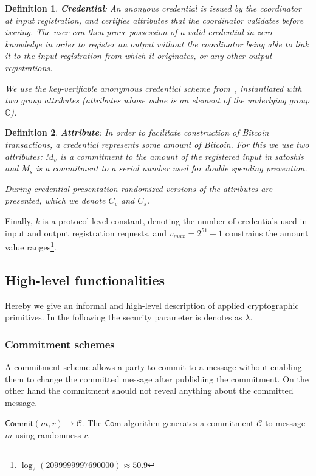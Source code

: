 \documentclass{article}
\newtheorem{definition}{Definition}[section]
\begin{document}
\begin{definition} \textbf{Credential}:
An anonyous credential is issued by the coordinator at input registration, and certifies attributes that the coordinator validates before issuing. The user can then prove possession of a valid credential in zero-knowledge in order to register an output without the coordinator being able to link it to the input registration from which it originates, or any other output registrations.

We use the key-verifiable anonymous credential scheme from~\cite{chase2019signal}, instantiated with two group attributes (attributes whose value is an element of the underlying group $\mathbb{G}$).
\end{definition}

\begin{definition}\textbf{Attribute}:
In order to facilitate construction of Bitcoin transactions, a credential represents some amount of Bitcoin. For this we use two attributes: $M_v$ is a commitment to the amount of the registered input in satoshis and $M_s$ is a commitment to a serial number used for double spending prevention.

During credential presentation randomized versions of the attributes are presented, which we denote $C_v$ and $C_s$.
\end{definition}

Finally, $k$ is a protocol level constant, denoting the number of credentials used in input and output registration requests, and $v_{\mathit{max}} = 2^{51}-1$ constrains the amount value ranges\footnote{$\log_2(2099999997690000) \approx 50.9$}.

\subsection{High-level functionalities}
Hereby we give an informal and high-level description of applied cryptographic primitives. In the following the security parameter is denotes as $\lambda$. 
\subsubsection{Commitment schemes}
A commitment scheme allows a party to commit to a message without enabling them to change the committed message after publishing the commitment. On the other hand the commitment should not reveal anything about the committed message.

\noindent$\mathsf{Commit}(m,r)\xrightarrow{}\mathcal{C}$. The $\mathsf{Com}$ algorithm generates a commitment $\mathcal{C}$ to message $m$ using randomness $r$.
\end{document}
